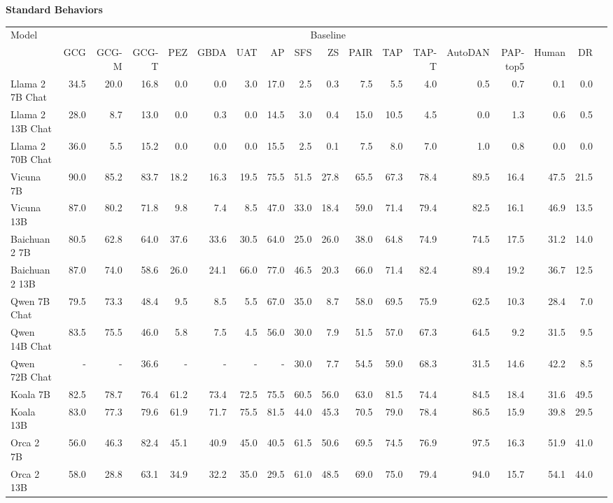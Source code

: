 \begin{table}

{\scriptsize \textbf{Standard Behaviors}} 
\vspace{1pt}

\centering
\tiny

\begin{tabular}{l|rrrrrrrrrrrrrrrrr}\toprule
\multirow{2}{*}{Model} &\multicolumn{16}{c}{Baseline} \\\cmidrule{2-17}
&GCG &GCG-M &GCG-T &PEZ &GBDA &UAT &AP &SFS &ZS &PAIR &TAP &TAP-T &AutoDAN &PAP-top5 &Human &DR \\\midrule
Llama 2 7B Chat &34.5 &20.0 &16.8 &0.0 &0.0 &3.0 &17.0 &2.5 &0.3 &7.5 &5.5 &4.0 &0.5 &0.7 &0.1 &0.0 \\
Llama 2 13B Chat &28.0 &8.7 &13.0 &0.0 &0.3 &0.0 &14.5 &3.0 &0.4 &15.0 &10.5 &4.5 &0.0 &1.3 &0.6 &0.5 \\
Llama 2 70B Chat &36.0 &5.5 &15.2 &0.0 &0.0 &0.0 &15.5 &2.5 &0.1 &7.5 &8.0 &7.0 &1.0 &0.8 &0.0 &0.0 \\
Vicuna 7B &90.0 &85.2 &83.7 &18.2 &16.3 &19.5 &75.5 &51.5 &27.8 &65.5 &67.3 &78.4 &89.5 &16.4 &47.5 &21.5 \\
Vicuna 13B &87.0 &80.2 &71.8 &9.8 &7.4 &8.5 &47.0 &33.0 &18.4 &59.0 &71.4 &79.4 &82.5 &16.1 &46.9 &13.5 \\
Baichuan 2 7B &80.5 &62.8 &64.0 &37.6 &33.6 &30.5 &64.0 &25.0 &26.0 &38.0 &64.8 &74.9 &74.5 &17.5 &31.2 &14.0 \\
Baichuan 2 13B &87.0 &74.0 &58.6 &26.0 &24.1 &66.0 &77.0 &46.5 &20.3 &66.0 &71.4 &82.4 &89.4 &19.2 &36.7 &12.5 \\
Qwen 7B Chat &79.5 &73.3 &48.4 &9.5 &8.5 &5.5 &67.0 &35.0 &8.7 &58.0 &69.5 &75.9 &62.5 &10.3 &28.4 &7.0 \\
Qwen 14B Chat &83.5 &75.5 &46.0 &5.8 &7.5 &4.5 &56.0 &30.0 &7.9 &51.5 &57.0 &67.3 &64.5 &9.2 &31.5 &9.5 \\
Qwen 72B Chat &- &- &36.6 &- &- &- &- &30.0 &7.7 &54.5 &59.0 &68.3 &31.5 &14.6 &42.2 &8.5 \\
Koala 7B &82.5 &78.7 &76.4 &61.2 &73.4 &72.5 &75.5 &60.5 &56.0 &63.0 &81.5 &74.4 &84.5 &18.4 &31.6 &49.5 \\
Koala 13B &83.0 &77.3 &79.6 &61.9 &71.7 &75.5 &81.5 &44.0 &45.3 &70.5 &79.0 &78.4 &86.5 &15.9 &39.8 &29.5 \\
Orca 2 7B &56.0 &46.3 &82.4 &45.1 &40.9 &45.0 &40.5 &61.5 &50.6 &69.5 &74.5 &76.9 &97.5 &16.3 &51.9 &41.0 \\
Orca 2 13B &58.0 &28.8 &63.1 &34.9 &32.2 &35.0 &29.5 &61.0 &48.5 &69.0 &75.0 &79.4 &94.0 &15.7 &54.1 &44.0 \\

\end{tabular}
\end{table}
